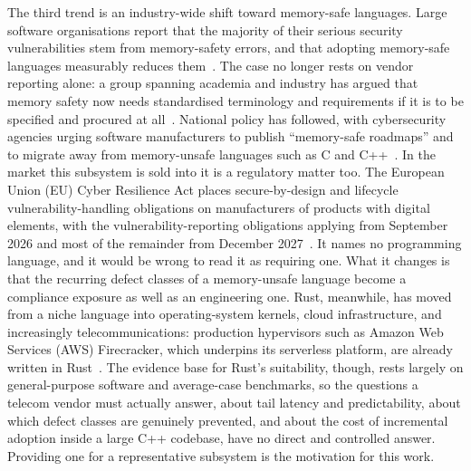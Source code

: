 \documentclass[english,oneside,a4paper,censored,csm,software-track-2020]{HYthesisML}
\begin{document}
The third trend is an industry-wide shift toward memory-safe languages. Large software
organisations report that the majority of their serious security vulnerabilities stem from
memory-safety errors, and that adopting memory-safe languages measurably reduces
them~\cite{msrc2019memory,google2022android,vanderstoep2025android,google2024securebydesign}. The
case no longer rests on vendor reporting alone: a group spanning academia and industry has argued
that memory safety now needs standardised terminology and requirements if it is to be specified
and procured at all~\cite{watson2025memorysafety}. National policy has followed, with
cybersecurity agencies urging software manufacturers to publish ``memory-safe roadmaps'' and to
migrate away from memory-unsafe languages such as C and
C++~\cite{cisa2023memorysafe,oncd2024building}. In the market this subsystem is sold into it is a
regulatory matter too. The European Union (EU) Cyber Resilience Act places secure-by-design and
lifecycle vulnerability-handling obligations on manufacturers of products with digital elements,
with the vulnerability-reporting obligations applying from September 2026 and most of the
remainder from December 2027~\cite{eu2024cra}. It names no programming language, and it would be
wrong to read it as requiring one. What it changes is that the recurring defect classes of a
memory-unsafe language become a compliance exposure as well as an engineering one. Rust,
meanwhile, has moved from a niche language into operating-system kernels, cloud infrastructure,
and increasingly telecommunications: production hypervisors such as Amazon Web Services (AWS)
Firecracker, which underpins its serverless platform, are already written in
Rust~\cite{agache2020firecracker}. The evidence base for Rust's suitability, though, rests
largely on general-purpose software and average-case benchmarks, so the questions a telecom
vendor must actually answer, about tail latency and predictability, about which defect classes
are genuinely prevented, and about the cost of incremental adoption inside a large C++ codebase,
have no direct and controlled answer. Providing one for a representative subsystem is the
motivation for this work.
\end{document}
